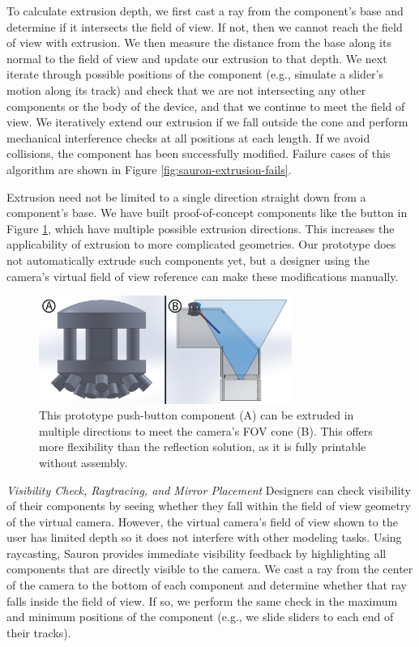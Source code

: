 To calculate extrusion depth, we first cast a ray from the component's base and determine if it intersects the field of view. If not, then we cannot reach the field of view with extrusion. We then measure the distance from the base along its normal to the field of view and update our extrusion to that depth. We next iterate through possible positions of the component (e.g., simulate a slider's motion along its track) and check that we are not intersecting any other components or the body of the device, and that we continue to meet the field of view. We iteratively extend our extrusion if we fall outside the cone and perform mechanical interference checks at all positions at each length. If we avoid collisions, the component has been successfully modified. Failure cases of this algorithm are shown in Figure \ref{fig:sauron-extrusion-fails}.

Extrusion need not be limited to a single direction straight down from a component's base. We have built proof-of-concept components like the button in Figure \ref{fig:sauron-extrusion-multi}, which have multiple possible extrusion directions. This increases the applicability of extrusion to more complicated geometries. Our prototype does not automatically extrude such components yet, but a designer using the camera's virtual field of view reference can make these modifications manually.

\begin{figure}
\centering
\includegraphics[width=3.25in]{figures/sauron/extrusion++.png}
\caption{This prototype push-button component (A) can be extruded in multiple directions to meet the camera's FOV cone (B). This offers more flexibility than the reflection solution, as it is fully printable without assembly.
}
\label{fig:sauron-extrusion-multi}
\end{figure}


\emph{Visibility Check, Raytracing, and Mirror Placement}
Designers can check visibility of their components by seeing whether they fall within the field of view geometry of the virtual camera. However, the virtual camera's field of view shown to the user has limited depth so it does not interfere with other modeling tasks. Using raycasting, Sauron  provides immediate visibility feedback by highlighting all components that are directly visible to the camera. We cast a ray from the center of the camera to the bottom of each component and determine whether that ray falls inside the field of view. If so, we perform the same check in the maximum and minimum positions of the component (e.g., we slide sliders to each end of their tracks). %


